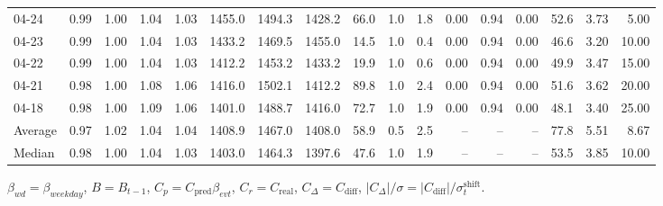 \begin{threeparttable}
{\begin{tabular}{lrrrrrrrrrrrrrrrr}
  04-24 &         0.99 &           1.00 &          1.04 &          1.03 & 1455.0 & 1494.3 & 1428.2 &       66.0 &                      1.0 &                 1.8 &       0.00 &      0.94 &           0.00 &             52.6 &            3.73 &                   5.00 \\
  04-23 &         0.99 &           1.00 &          1.04 &          1.03 & 1433.2 & 1469.5 & 1455.0 &       14.5 &                      1.0 &                 0.4 &       0.00 &      0.94 &           0.00 &             46.6 &            3.20 &                  10.00 \\
  04-22 &         0.99 &           1.00 &          1.04 &          1.03 & 1412.2 & 1453.2 & 1433.2 &       19.9 &                      1.0 &                 0.6 &       0.00 &      0.94 &           0.00 &             49.9 &            3.47 &                  15.00 \\
  04-21 &         0.98 &           1.00 &          1.08 &          1.06 & 1416.0 & 1502.1 & 1412.2 &       89.8 &                      1.0 &                 2.4 &       0.00 &      0.94 &           0.00 &             51.6 &            3.62 &                  20.00 \\
  04-18 &         0.98 &           1.00 &          1.09 &          1.06 & 1401.0 & 1488.7 & 1416.0 &       72.7 &                      1.0 &                 1.9 &       0.00 &      0.94 &           0.00 &             48.1 &            3.40 &                  25.00 \\
Average &         0.97 &           1.02 &          1.04 &          1.04 & 1408.9 & 1467.0 & 1408.0 &       58.9 &                      0.5 &                 2.5 &         -- &        -- &             -- &             77.8 &            5.51 &                   8.67 \\
 Median &         0.98 &           1.00 &          1.04 &          1.03 & 1403.0 & 1464.3 & 1397.6 &       47.6 &                      1.0 &                 1.9 &         -- &        -- &             -- &             53.5 &            3.85 &                  10.00 \\
\bottomrule
\end{tabular}
}
\begin{tablenotes}\footnotesize
\item $\beta_{wd}=\beta_{weekday}$, $B=B_{t-1}$,
$C_p=C_{\text{pred}}\beta_{evt}$, $C_r=C_{\text{real}}$,
$C_\Delta=C_{\text{diff}}$, $|C_\Delta|/\sigma=|C_{\text{diff}}|/\sigma_t^{\text{shift}}$.
\end{tablenotes}
\end{threeparttable}
\endgroup
